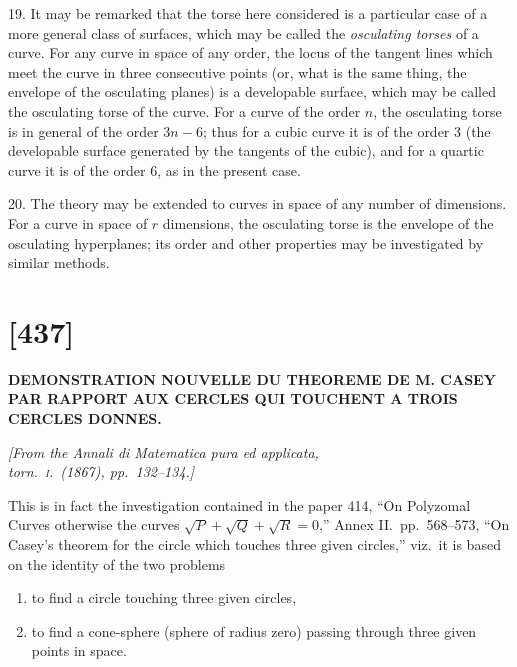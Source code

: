 \documentclass[11pt,a4paper]{article}
\begin{document}
19. It may be remarked that the torse here considered is a particular case of a more general class of surfaces, which may be called the \textit{osculating torses} of a curve. For any curve in space of any order, the locus of the tangent lines which meet the curve in three consecutive points (or, what is the same thing, the envelope of the osculating planes) is a developable surface, which may be called the osculating torse of the curve. For a curve of the order $n$, the osculating torse is in general of the order $3n - 6$; thus for a cubic curve it is of the order 3 (the developable surface generated by the tangents of the cubic), and for a quartic curve it is of the order 6, as in the present case.

20. The theory may be extended to curves in space of any number of dimensions. For a curve in space of $r$ dimensions, the osculating torse is the envelope of the osculating hyperplanes; its order and other properties may be investigated by similar methods.

\newpage
\section*{[437]}

\begin{center}
\textbf{\Large DEMONSTRATION NOUVELLE DU THEOREME DE M. CASEY}\\[0.3em]
\textbf{\Large PAR RAPPORT AUX CERCLES QUI TOUCHENT A TROIS}\\[0.3em]
\textbf{\Large CERCLES DONNES.}
\end{center}

\begin{flushright}
\textit{[From the \textit{Annali di Matematica pura ed applicata},}\\
\textit{torn.\ \textsc{i}.\ (1867), pp.\ 132--134.]}
\end{flushright}

\vspace{1em}

\noindent
This is in fact the investigation contained in the paper 414, ``On Polyzomal Curves otherwise the curves $\sqrt{P} + \sqrt{Q} + \sqrt{R} = 0$,'' Annex II.\ pp.\ 568--573, ``On Casey's theorem for the circle which touches three given circles,'' viz.\ it is based on the identity of the two problems
\begin{enumerate}[label=$\circ$]
\item to find a circle touching three given circles,
\item to find a cone-sphere (sphere of radius zero) passing through three given points in space.
\end{enumerate}
\end{document}
